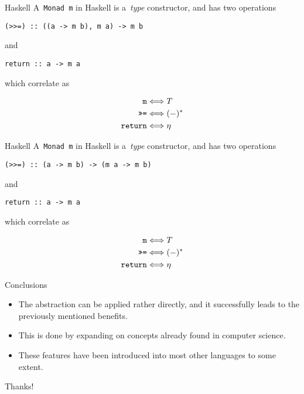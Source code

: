 \documentclass{beamer}
\begin{document}
\begin{frame}[fragile]{Haskell}
    A~\texttt{Monad m} in Haskell is a~\emph{type} constructor, and
    has two operations
    \begin{verbatim}
(>>=) :: ((a -> m b), m a) -> m b
    \end{verbatim}
    and
    \begin{verbatim}
return :: a -> m a
    \end{verbatim}
    which correlate as

    \begin{align*}
        \text{\texttt{m}} &\Longleftrightarrow T \\
        \text{\texttt{>>=}} &\Longleftrightarrow (-)^{\ast} \\
        \text{\texttt{return}} &\Longleftrightarrow \eta
    \end{align*}
\end{frame}

\begin{frame}[fragile]{Haskell}
    A~\texttt{Monad m} in Haskell is a~\emph{type} constructor, and
    has two operations
    \begin{verbatim}
(>>=) :: (a -> m b) -> (m a -> m b)
    \end{verbatim}
    and
    \begin{verbatim}
return :: a -> m a
    \end{verbatim}
    which correlate as

    \begin{align*}
        \text{\texttt{m}} &\Longleftrightarrow T \\
        \text{\texttt{>>=}} &\Longleftrightarrow (-)^{\ast} \\
        \text{\texttt{return}} &\Longleftrightarrow \eta
    \end{align*}
\end{frame}

\begin{frame}{Conclusions}
    \begin{itemize}
        \item The abstraction can be applied rather directly, and it
            successfully leads to the previously mentioned benefits.

            \pause

        \item This is done by expanding on concepts already found in computer
            science.

            \pause

        \item These features have been introduced into most other languages to
            some extent.
    \end{itemize}
\end{frame}

\begin{frame}
    \begin{center}
        \Huge Thanks!
    \end{center}
\end{frame}
\end{document}
